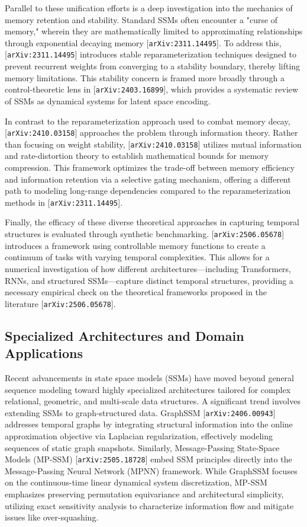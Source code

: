 \documentclass[11pt]{article}
\begin{document}
Parallel to these unification efforts is a deep investigation into the mechanics of memory retention and stability. Standard SSMs often encounter a "curse of memory," wherein they are mathematically limited to approximating relationships through exponential decaying memory [\texttt{arXiv:2311.14495}]. To address this, [\texttt{arXiv:2311.14495}] introduces stable reparameterization techniques designed to prevent recurrent weights from converging to a stability boundary, thereby lifting memory limitations. This stability concern is framed more broadly through a control-theoretic lens in [\texttt{arXiv:2403.16899}], which provides a systematic review of SSMs as dynamical systems for latent space encoding.

In contrast to the reparameterization approach used to combat memory decay, [\texttt{arXiv:2410.03158}] approaches the problem through information theory. Rather than focusing on weight stability, [\texttt{arXiv:2410.03158}] utilizes mutual information and rate-distortion theory to establish mathematical bounds for memory compression. This framework optimizes the trade-off between memory efficiency and information retention via a selective gating mechanism, offering a different path to modeling long-range dependencies compared to the reparameterization methods in [\texttt{arXiv:2311.14495}].

Finally, the efficacy of these diverse theoretical approaches in capturing temporal structures is evaluated through synthetic benchmarking. [\texttt{arXiv:2506.05678}] introduces a framework using controllable memory functions to create a continuum of tasks with varying temporal complexities. This allows for a numerical investigation of how different architectures—including Transformers, RNNs, and structured SSMs—capture distinct temporal structures, providing a necessary empirical check on the theoretical frameworks proposed in the literature [\texttt{arXiv:2506.05678}].

\subsection{Specialized Architectures and Domain Applications}

Recent advancements in state space models (SSMs) have moved beyond general sequence modeling toward highly specialized architectures tailored for complex relational, geometric, and multi-scale data structures. A significant trend involves extending SSMs to graph-structured data. GraphSSM [\texttt{arXiv:2406.00943}] addresses temporal graphs by integrating structural information into the online approximation objective via Laplacian regularization, effectively modeling sequences of static graph snapshots. Similarly, Message-Passing State-Space Models (MP-SSM) [\texttt{arXiv:2505.18728}] embed SSM principles directly into the Message-Passing Neural Network (MPNN) framework. While GraphSSM focuses on the continuous-time linear dynamical system discretization, MP-SSM emphasizes preserving permutation equivariance and architectural simplicity, utilizing exact sensitivity analysis to characterize information flow and mitigate issues like over-squashing.
\end{document}
